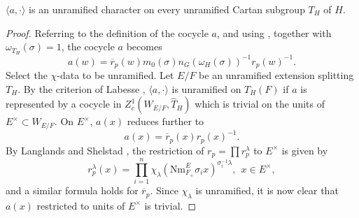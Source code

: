 \documentclass{amsart}
\newenvironment{cthm}[1]
  {\renewcommand\thethm{\bf #1}\thm}
  {\endthm}
\def\Gal{\operatorname{\text{Gal}}}          %
\def\Def{\overset{\operatorname{def}}=}   %
\def\what#1{\widehat#1}
\def\tild#1{\widetilde#1}
\def\LABESSEC{19}
\def\LANGLANDSO{21}
\begin{document}
\begin{cthm}{Lemma 11.2}  $\langle a,\cdot \rangle$ is an unramified
character on every unramified Cartan subgroup $T_H$ of $H$.\end{cthm}

\begin{proof}  %
Referring to the definition of the cocycle $a$, and
using \cite{\LANGLANDSO, 2.1.A}, together with $\omega_{T_H}(\sigma)=1$, the
cocycle $a$ becomes
$$
a(w) = \overline r_p(w)m_0(\sigma)n_G(\omega_H(\sigma))^{-1}r_p(w)^{-1}.
$$
Select the $\chi$-data to be unramified.
Let $E/F$ be an unramified extension splitting $T_H$.  By
the criterion of Labesse \cite{\LABESSEC,6.3,5.9}, $\langle a,\cdot\rangle$
is unramified on $T_H(F)$ if $a$ is represented by a cocycle
in $Z_c^1(W_{E/F},\what T_H)$ which is trivial on the units of $E^\times
\subset W_{E/F}$.  On $E^\times$, $a(x)$ reduces further to
$$a(x) = \overline r_p(x) r_p(x)^{-1}.$$
By Langlands and Shelstad \cite{\LANGLANDSO,p237}, the restriction
of $r_p =\prod r_p^\lambda$ to $E^\times$ is given by
$$r_p^\lambda(x) = \prod_{i=1}^n\chi_\lambda(\text{Nm}^E_{F_+}
	\sigma_ix)^{\sigma_i^{-1}\lambda},\ \ x\in E^\times,$$
and a similar formula holds for $\overline r_p$.  Since $\chi_\lambda$ is
unramified, it is now clear that $a(x)$ restricted to units of
$E^\times$ is trivial.
\end{proof}




\end{document}
